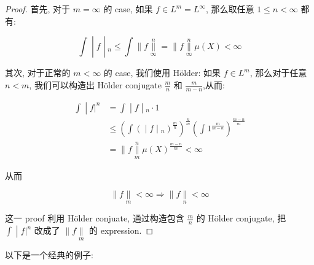 \documentclass{qlnotes-export}
\begin{document}
\begin{proof}

首先, 对于 \(m = \infty\) 的 case, 如果 \(f \in L^{m} = L^{\infty}\), 那么取任意 \(1 \leq n < \infty\) 都有:

\[\left. \int \middle| f \middle| {}_{n} \leq \int \parallel f\underset{\infty}{\overset{n}{\parallel}} = \parallel f\underset{\infty}{\overset{n}{\parallel}}\mu(X) < \infty \right.\]

其次, 对于正常的 \(m < \infty\) 的 case, 我们使用 Hölder: 如果 \(f \in L^{m}\), 那么对于任意 \(n < m\), 我们可以构造出 Hölder conjugate \(\frac{m}{n}\) 和 \(\frac{m}{m - n}\),从而:

\[\begin{matrix}
\left. \int \middle| f|^{n} \right. & \left. = \int \middle| f \middle| {}_{n} \cdot 1 \right. \\
 & \left. \leq (\int( \middle| f \middle| {}_{n})^{\frac{m}{n}})^{\frac{n}{m}}(\int 1^{\frac{m}{m - n}})^{\frac{m - n}{m}} \right. \\
 & {= \parallel f\underset{m}{\overset{n}{\parallel}}\mu(X)^{\frac{m - n}{m}} < \infty}
\end{matrix}\]

从而

\[\parallel f\underset{m}{\parallel} < \infty\Longrightarrow \parallel f\underset{n}{\parallel} < \infty\]

这一 proof 利用 Hölder conjuate, 通过构造包含 \(\frac{m}{n}\) 的 Hölder conjugate, 把 \(\left. \int \middle| f|^{n} \right.\) 改成了 \(\parallel f\underset{m}{\parallel}\) 的 expression.

\end{proof}

以下是一个经典的例子:
\end{document}
